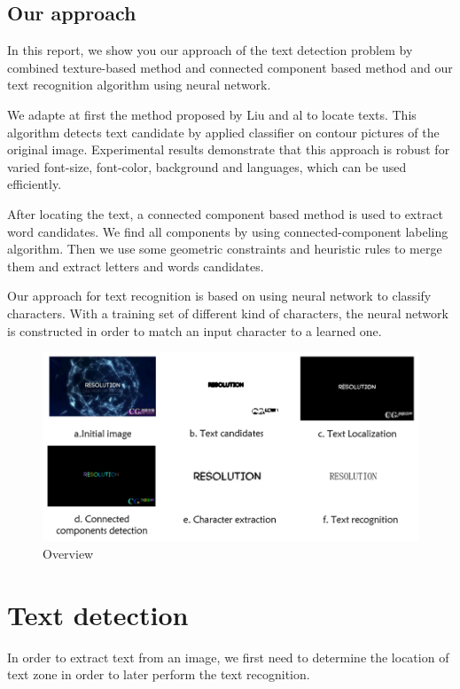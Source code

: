 \documentclass[paper=a4, french, 11pt]{scrartcl}
\begin{document}
\subsection{Our approach}
In this report, we show you our approach of the text detection problem by combined texture-based method and connected component based method and our text recognition algorithm using neural network. 

We adapte at first the method proposed by Liu and al to locate texts. This algorithm detects text candidate by applied classifier on contour pictures of the original image. Experimental results demonstrate that this approach is robust for varied font-size, font-color, background and languages, which can be used efficiently.

After locating the text, a connected component based method is used to extract word candidates. We find all components by using connected-component labeling algorithm. Then we use some geometric constraints and heuristic rules to merge them and extract letters and words candidates.  

Our approach for text recognition is based on using neural network to classify characters. With a training set of different kind of characters, the neural network is constructed in order to match an input character to a learned one. 


\begin{figure}[h]
\begin{center}
	\vspace{-1ex}
   \includegraphics[width=0.9\linewidth]{process.png}
\end{center}
\vspace{-4ex}
\caption{Overview}
\label{fig:heatmap}
\end{figure}

\section{Text detection}
In order to extract text from an image, we first need to determine the location of text zone in order to later perform the text recognition.  
\end{document}
